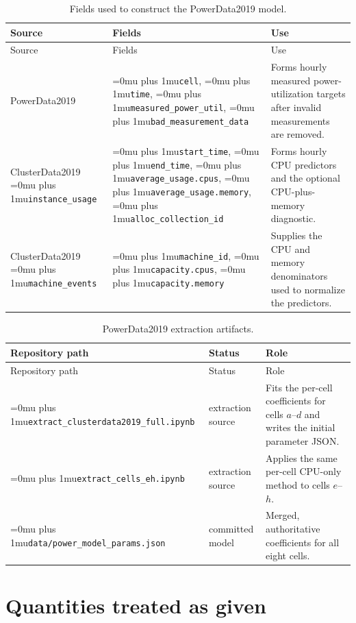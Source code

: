 \documentclass[12pt]{article}
\newcommand{\codepath}[1]{{\Urlmuskip=0mu plus 1mu\relax\nolinkurl{#1}}}
\begin{document}
\begin{longtable}{@{}L{0.22\textwidth}L{0.30\textwidth}L{0.40\textwidth}@{}}
  \caption{Fields used to construct the PowerData2019 model.}
  \label{tab:powerdata-fields}\\
  \toprule
  Source & Fields & Use \\
  \midrule
  \endfirsthead
  \toprule
  Source & Fields & Use \\
  \midrule
  \endhead
  PowerData2019
    & \codepath{cell}, \codepath{time},
      \codepath{measured_power_util},
      \codepath{bad_measurement_data}
    & Forms hourly measured power-utilization targets after invalid
      measurements are removed. \\
  ClusterData2019 \codepath{instance_usage}
    & \codepath{start_time}, \codepath{end_time},
      \codepath{average_usage.cpus},
      \codepath{average_usage.memory},
      \codepath{alloc_collection_id}
    & Forms hourly CPU predictors and the optional CPU-plus-memory diagnostic. \\
  ClusterData2019 \codepath{machine_events}
    & \codepath{machine_id}, \codepath{capacity.cpus},
      \codepath{capacity.memory}
    & Supplies the CPU and memory denominators used to normalize the predictors. \\
  \bottomrule
\end{longtable}

\begin{longtable}{@{}L{0.34\textwidth}L{0.19\textwidth}L{0.39\textwidth}@{}}
  \caption{PowerData2019 extraction artifacts.}
  \label{tab:powerdata-lineage}\\
  \toprule
  Repository path & Status & Role \\
  \midrule
  \endfirsthead
  \toprule
  Repository path & Status & Role \\
  \midrule
  \endhead
  \codepath{extract_clusterdata2019_full.ipynb}
    & extraction source
    & Fits the per-cell coefficients for cells \(a\)--\(d\) and writes the
      initial parameter JSON. \\
  \codepath{extract_cells_eh.ipynb}
    & extraction source
    & Applies the same per-cell CPU-only method to cells \(e\)--\(h\). \\
  \codepath{data/power_model_params.json}
    & committed model
    & Merged, authoritative coefficients for all eight cells. \\
  \bottomrule
\end{longtable}

\section{Quantities treated as given}
\label{app:given-inputs}
\end{document}
